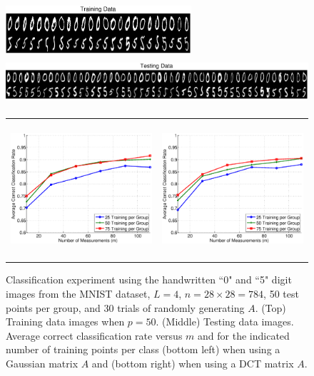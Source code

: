 \documentclass[twoside,11pt]{article}
\newcommand{\edit}[1]{{{#1}}}
\begin{document}
\begin{figure}[!htbp]
\centering
\includegraphics[height=0.7in]{images/MNIST/groups_0_5/mnist_2a.eps} 
\includegraphics[height=0.7in]{images/MNIST/groups_0_5/mnist_2c.eps} 
\begin{tabular}{cc}
\includegraphics[height=2in]{images/MNIST/groups_0_5/mnist_2b.eps} &
\includegraphics[height=2in]{images/MNIST/groups_0_5/mnist_2d.eps} %
\end{tabular}
\caption{Classification experiment using the handwritten ``0" and ``5" digit images from the MNIST dataset, $L=4$, $n=28\times 28=784$, 50 test points per group, and 30 trials of randomly generating $A$. (Top) Training data images when $p = 50$. (Middle) Testing data images. Average correct classification rate versus $m$ and for the indicated number of training points per class \edit{(bottom left) when using a Gaussian matrix $A$ and (bottom right) when using a DCT matrix $A$.}}
\label{mnist:05}
\end{figure}
\end{document}
